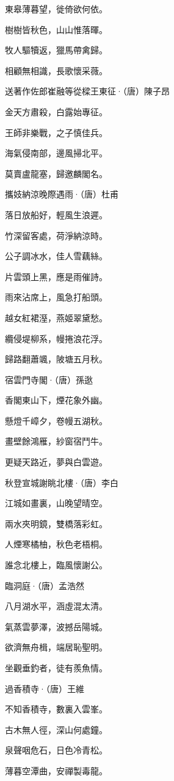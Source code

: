 \documentclass[12pt,a4paper]{ctexbook}
\begin{document}
東皋薄暮望，徙倚欲何依。\par
樹樹皆秋色，山山惟落暉。\par
牧人驅犢返，獵馬帶禽歸。\par
相顧無相識，長歌懷采薇。\par
送著作佐郎崔融等從樑王東征·（唐）陳子昂\par
金天方肅殺，白露始專征。\par
王師非樂戰，之子慎佳兵。\par
海氣侵南部，邊風掃北平。\par
莫賣盧龍塞，歸邀麟閣名。\par
攜妓納涼晚際遇雨·（唐）杜甫\par
落日放船好，輕風生浪遲。\par
竹深留客處，荷淨納涼時。\par
公子調冰水，佳人雪藕絲。\par
片雲頭上黑，應是雨催詩。\par
雨來沾席上，風急打船頭。\par
越女紅裙溼，燕姬翠黛愁。\par
纜侵堤柳系，幔捲浪花浮。\par
歸路翻蕭颯，陂塘五月秋。\par
宿雲門寺閣·（唐）孫逖\par
香閣東山下，煙花象外幽。\par
懸燈千嶂夕，卷幔五湖秋。\par
畫壁餘鴻雁，紗窗宿鬥牛。\par
更疑天路近，夢與白雲遊。\par
秋登宣城謝眺北樓·（唐）李白\par
江城如畫裏，山晚望晴空。\par
兩水夾明鏡，雙橋落彩虹。\par
人煙寒橘柚，秋色老梧桐。\par
誰念北樓上，臨風懷謝公。\par
臨洞庭·（唐）孟浩然\par
八月湖水平，涵虛混太清。\par
氣蒸雲夢澤，波撼岳陽城。\par
欲濟無舟楫，端居恥聖明。\par
坐觀垂釣者，徒有羨魚情。\par
過香積寺·（唐）王維\par
不知香積寺，數裏入雲峯。\par
古木無人徑，深山何處鐘。\par
泉聲咽危石，日色冷青松。\par
薄暮空潭曲，安禪製毒龍。\par
\end{document}
